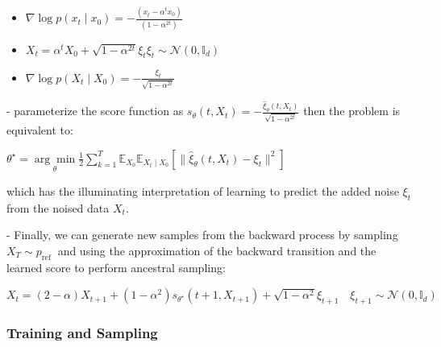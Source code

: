 \begin{itemize}
  \item $\nabla \log p(x_{t} \mid x_{0})=-\frac{(x_{t}-\alpha^{t} x_{0})}{(1-\alpha^{2 t})}$

  \item $X_{t}=\alpha^{t} X_{0}+\sqrt{1-\alpha^{2 t}} \xi_{t} \xi_{t} \sim \mathcal{N}(0, \mathbb{I}_{d})$

  \item $\nabla \log p(X_{t} \mid X_{0})=-\frac{\xi_{t}}{\sqrt{1-\alpha^{2 t}}}$

\end{itemize}

- parameterize the score function as $s_{\theta}(t, X_{t})=-\frac{\hat{\xi}_{\theta}(t, X_{t})}{\sqrt{1-\alpha^{2 t}}}$ then the problem is equivalent to:

$
\theta^{\star}=\underset{\theta}{\arg \min } \frac{1}{2} \sum_{k=1}^{T} \mathbb{E}_{X_{0}} \mathbb{E}_{X_{t} \mid X_{0}}[\|\hat{\xi}_{\theta}(t, X_{t})-\xi_{t}\|^{2}]
$

which has the illuminating interpretation of learning to predict the added noise $\xi_{t}$ from the noised data $X_{t}$.

- Finally, we can generate new samples from the backward process by sampling $X_{T} \sim p_{\text {ref }}$ and using the approximation of the backward transition and the learned score to perform ancestral sampling:

$
X_{t}=(2-\alpha) X_{t+1}+(1-\alpha^{2}) s_{\theta^{\star}}(t+1, X_{t+1})+\sqrt{1-\alpha^{2}} \xi_{t+1} \quad \xi_{t+1} \sim \mathcal{N}(0, \mathbb{I}_{d})
$






\subsubsection*{Training and Sampling}

